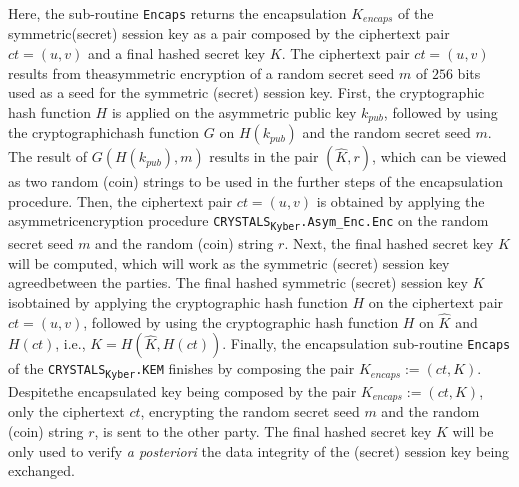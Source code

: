 \documentclass[runningheads]{llncs}
\numberwithin{equation}{section}
\begin{document}
    \noindent Here, the sub-routine \texttt{Encaps} returns the encapsulation ${K}_{encaps}$ of the symmetric\break (secret) session key as a pair composed by the ciphertext pair $ct = (u,v)$ and a final hashed secret key $K$. The ciphertext pair $ct = (u,v)$ results from the\break asymmetric encryption of a random secret seed $m$ of $256$ bits used as a seed for the symmetric (secret) session key. First, the cryptographic hash function $H$ is applied on the asymmetric public key ${k}_{pub}$, followed by using the cryptographic\break hash function $G$ on $H({k}_{pub})$ and the random secret seed $m$. The result of $G(H({k}_{pub}), m)$ results in the pair $(\hat{K}, r)$, which can be viewed as two random (coin) strings to be used in the further steps of the encapsulation procedure. Then, the ciphertext pair $ct = (u,v)$ is obtained by applying the asymmetric\break encryption procedure \texttt{CRYSTALS}\textsubscript{\texttt{Kyber}}\texttt{.Asym\_Enc}\texttt{.Enc} on the random secret seed $m$ and the random (coin) string $r$. Next, the final hashed secret key $K$ will be computed, which will work as the symmetric (secret) session key agreed\break between the parties. The final hashed symmetric (secret) session key $K$ is\break obtained by applying the cryptographic hash function $H$ on the ciphertext pair $ct = (u,v)$, followed by using the cryptographic hash function $H$ on $\hat{K}$ and $H(ct)$, i.e., $K = H(\hat{K}, H(ct))$. Finally, the encapsulation sub-routine \texttt{Encaps} of the \texttt{CRYSTALS}\textsubscript{\texttt{Kyber}}\texttt{.KEM} finishes by composing the pair ${K}_{encaps} := (ct, K)$. Despite\break the encapsulated key being composed by the pair ${K}_{encaps} := (ct, K)$, only the ciphertext $ct$, encrypting the random secret seed $m$ and the random (coin) string $r$, is sent to the other party. The final hashed secret key $K$ will be only used to verify \textit{a posteriori} the data integrity of the (secret) session key being exchanged.

    \clearpage
    
\end{document}
